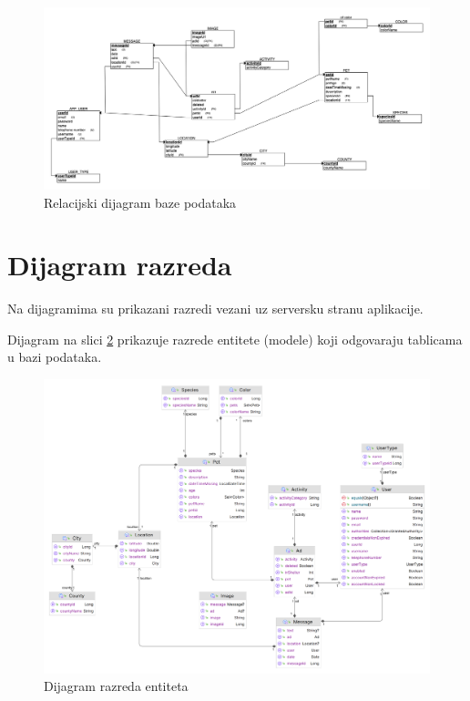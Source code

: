 			\begin{figure}[H]
				\includegraphics[scale=0.34]{slike/REL_DIAGRAM_FINAL.PNG} 
				\centering
				\caption{Relacijski dijagram baze podataka}
				\label{relational_diagram}
			\end{figure}
			
			\eject
			
			
		\section{Dijagram razreda}

			Na dijagramima su prikazani razredi vezani uz serversku stranu aplikacije.
			
			Dijagram na slici \ref{class_model} prikazuje razrede entitete (modele) koji odgovaraju tablicama u bazi podataka.
			
			\begin{figure}[H]
				\includegraphics[scale=0.225]{slike/class_model.PNG} 
				\centering
				\caption{Dijagram razreda entiteta}
				\label{class_model}
			\end{figure}
			
